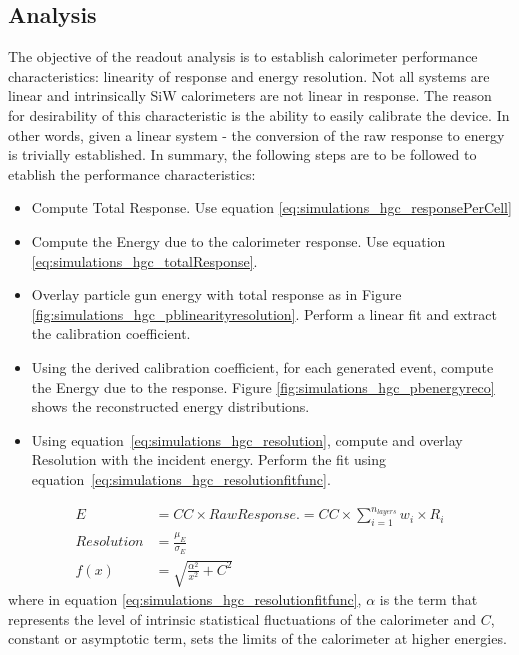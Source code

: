 \subsection{Analysis}
The objective of the readout analysis is to establish calorimeter performance characteristics: linearity of response and energy resolution. Not all systems are linear and intrinsically SiW calorimeters are not linear in response. The reason for desirability of this characteristic is the ability to easily calibrate the device. In other words, given a linear system - the conversion of the raw response to energy is trivially established. In summary, the following steps are to be followed to etablish the performance characteristics:
\begin{itemize}
    \item Compute Total Response. Use equation \ref{eq:simulations_hgc_responsePerCell}
    \item Compute the Energy due to the calorimeter response. Use equation \ref{eq:simulations_hgc_totalResponse}.
    \item Overlay particle gun energy with total response as in Figure \ref{fig:simulations_hgc_pblinearityresolution}. Perform a linear fit and extract the calibration coefficient.
    \item Using the derived calibration coefficient, for each generated event, compute the Energy due to the response. Figure \ref{fig:simulations_hgc_pbenergyreco} shows the reconstructed energy distributions.
    \item Using equation~\ref{eq:simulations_hgc_resolution}, compute and overlay Resolution with the incident energy. Perform the fit using equation~\ref{eq:simulations_hgc_resolutionfitfunc}.
\end{itemize}
\begin{subequations}\label{eq:simulations_hgc_definitions}
\begin{align}
    E& = {CC} \times {Raw Response}. = {CC} \times {\sum_{i=1}^{n_{layers}} w_i \times  R_{i}}\label{eq:simulations_hgc_totalResponse}\\
    {Resolution}& = {\frac{\mu_E}{\sigma_E}}\label{eq:simulations_hgc_resolution}\\
    {f(x)}& = {\sqrt{\frac{\alpha^2}{x^2} + C^2}}\label{eq:simulations_hgc_resolutionfitfunc}
\end{align}
\end{subequations}
where in equation \ref{eq:simulations_hgc_resolutionfitfunc}, $\alpha$ is the term that represents the level of intrinsic statistical fluctuations of the calorimeter and $C$, constant or asymptotic term, sets the limits of the calorimeter at higher energies.

